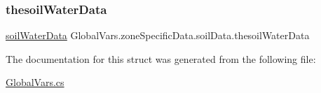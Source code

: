 \subsubsection{\texorpdfstring{thesoilWaterData}{thesoilWaterData}}
{\footnotesize\ttfamily \mbox{\hyperlink{struct_global_vars_1_1zone_specific_data_1_1soil_water_data}{soil\+Water\+Data}} Global\+Vars.\+zone\+Specific\+Data.\+soil\+Data.\+thesoil\+Water\+Data}



The documentation for this struct was generated from the following file\+:\begin{DoxyCompactItemize}
\item 
\mbox{\hyperlink{_global_vars_8cs}{Global\+Vars.\+cs}}\end{DoxyCompactItemize}
